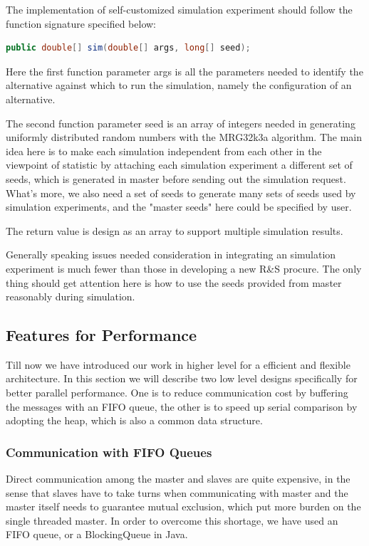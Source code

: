 \documentclass[12pt,a4paper]{report}
\begin{document}
The implementation of self-customized simulation experiment should follow the function signature specified below:

\begin{lstlisting}[language=Java]
public double[] sim(double[] args, long[] seed);
\end{lstlisting}

Here the first function parameter args is all the parameters needed to identify the alternative against which to run the simulation, namely the configuration of an alternative.

The second function parameter seed is an array of integers needed in generating uniformly distributed random numbers with the MRG32k3a algorithm. The main idea here is to make each simulation independent from each other in the viewpoint of statistic by attaching each simulation experiment a different set of seeds, which is generated in master before sending out the simulation request. What's more, we also need a set of seeds to generate many sets of seeds used by simulation experiments, and the "master seeds" here could be specified by user.

The return value is design as an array to support multiple simulation results.

Generally speaking issues needed consideration in integrating an simulation experiment is much fewer than those in developing a new R\&S procure. The only thing should get attention here is how to use the seeds provided from master reasonably during simulation.

\subsection{Features for Performance}

Till now we have introduced our work in higher level for a efficient and flexible architecture. In this section we will describe two low level designs specifically for better parallel performance. One is to reduce communication cost by buffering the messages with an FIFO queue, the other is to speed up serial comparison by adopting the heap, which is also a common data structure.

\subsubsection{Communication with FIFO Queues}

Direct communication among the master and slaves are quite expensive, in the sense that slaves have to take turns when communicating with master and the master itself needs to guarantee mutual exclusion, which put more burden on the single threaded master. In order to overcome this shortage, we have used an FIFO queue, or a BlockingQueue in Java.
\end{document}
